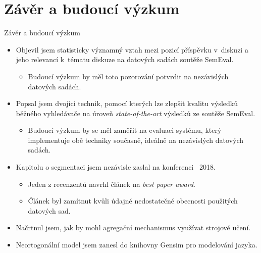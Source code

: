 \documentclass[aspectratio=169,t]{beamer}
\let\abbr\relax
\let\term\emph
\begin{document}

\section{Závěr a budoucí výzkum}
\begin{frame}[label=conclusion]{Závěr a budoucí výzkum}
\begin{itemize}
  \item<1-> Objevil jsem \alert<1-2>{statisticky významný vztah mezi pozicí
    příspěvku} v~diskuzi \alert<1-2>{a jeho relevancí} k~tématu diskuze na
    datových sadách soutěže SemEval.
  \begin{itemize}
    \item<2-> Budoucí výzkum by měl toto pozorování potvrdit na
      \alert<2>{nezávislých datových sadách}.
  \end{itemize}
  \item<3-> Popsal jsem \alert<3-4>{dvojici technik}, pomocí kterých lze
    \alert<3-4>{zlepšit kvalitu výsledků} běžného vyhledávače \alert<3-4>{na
    úroveň \term{state-of-the-art}} výsledků ze soutěže SemEval.
  \begin{itemize}
    \item<4-> Budoucí výzkum by se měl zaměřit na evaluaci systému, který
      \alert<4>{implementuje obě techniky současně}, ideálně na nezávislých
      datových sadách.
  \end{itemize}
  \item<5-> Kapitolu o segmentaci jsem nezávisle zaslal na konferenci \abbr{ECIR}~2018.
  \begin{itemize}
    \item<6-> Jeden z recenzentů \alert<6>{navrhl článek na \term{best paper award}}.
    \item<7-> Článek byl \alert<7>{zamítnut} kvůli údajné \alert<6-7>{nedostatečné
      obecnosti použitých datových sad}.
  \end{itemize}
  \item<8-> Načrtnul jsem, jak by mohl agregační mechanismus \alert<8>{využívat
    strojové učení}.
  \item<9-> Neortogonální model jsem \alert<9>{zanesl do knihovny Gensim pro
    modelování jazyka}.
\end{itemize}
\end{frame}
\end{document}
